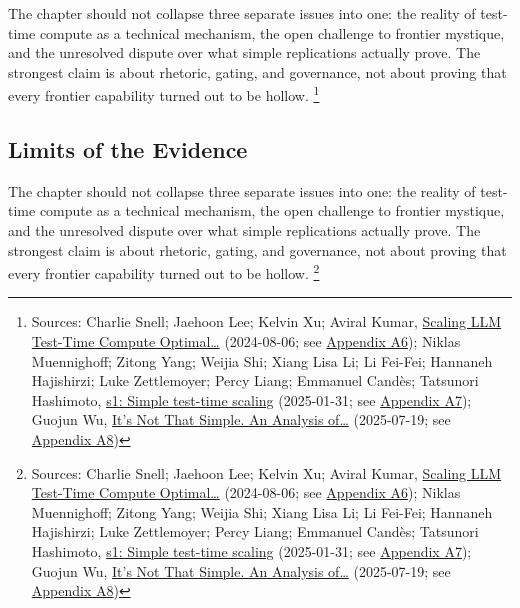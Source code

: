 \documentclass[
  american,
  11pt,
  letterpaper,
]{article}
\begin{document}
The chapter should not collapse three separate issues into one: the
reality of test-time compute as a technical mechanism, the open
challenge to frontier mystique, and the unresolved dispute over what
simple replications actually prove. The strongest claim is about
rhetoric, gating, and governance, not about proving that every frontier
capability turned out to be hollow. \footnote{Sources: Charlie Snell;
  Jaehoon Lee; Kelvin Xu; Aviral Kumar,
  \href{https://arxiv.org/abs/2408.03314}{Scaling LLM Test-Time Compute
  Optimal\ldots{}} (2024-08-06; see
  \hyperref[appendix-a6-scaling-llm-test-time-compute-optimally-can-be-more-effective-than-scaling-model-parameters]{Appendix
  A6}); Niklas Muennighoff; Zitong Yang; Weijia Shi; Xiang Lisa Li; Li
  Fei-Fei; Hannaneh Hajishirzi; Luke Zettlemoyer; Percy Liang; Emmanuel
  Candès; Tatsunori Hashimoto,
  \href{https://arxiv.org/abs/2501.19393}{s1: Simple test-time scaling}
  (2025-01-31; see
  \hyperref[appendix-a7-s1-simple-test-time-scaling]{Appendix A7});
  Guojun Wu, \href{https://arxiv.org/abs/2507.14419}{It's Not That
  Simple. An Analysis of\ldots{}} (2025-07-19; see
  \hyperref[appendix-a8-it-s-not-that-simple-an-analysis-of-simple-test-time-scaling]{Appendix
  A8})}

\subsection{Limits of the Evidence}\label{limits-of-the-evidence}

The chapter should not collapse three separate issues into one: the
reality of test-time compute as a technical mechanism, the open
challenge to frontier mystique, and the unresolved dispute over what
simple replications actually prove. The strongest claim is about
rhetoric, gating, and governance, not about proving that every frontier
capability turned out to be hollow. \footnote{Sources: Charlie Snell;
  Jaehoon Lee; Kelvin Xu; Aviral Kumar,
  \href{https://arxiv.org/abs/2408.03314}{Scaling LLM Test-Time Compute
  Optimal\ldots{}} (2024-08-06; see
  \hyperref[appendix-a6-scaling-llm-test-time-compute-optimally-can-be-more-effective-than-scaling-model-parameters]{Appendix
  A6}); Niklas Muennighoff; Zitong Yang; Weijia Shi; Xiang Lisa Li; Li
  Fei-Fei; Hannaneh Hajishirzi; Luke Zettlemoyer; Percy Liang; Emmanuel
  Candès; Tatsunori Hashimoto,
  \href{https://arxiv.org/abs/2501.19393}{s1: Simple test-time scaling}
  (2025-01-31; see
  \hyperref[appendix-a7-s1-simple-test-time-scaling]{Appendix A7});
  Guojun Wu, \href{https://arxiv.org/abs/2507.14419}{It's Not That
  Simple. An Analysis of\ldots{}} (2025-07-19; see
  \hyperref[appendix-a8-it-s-not-that-simple-an-analysis-of-simple-test-time-scaling]{Appendix
  A8})}
\end{document}
